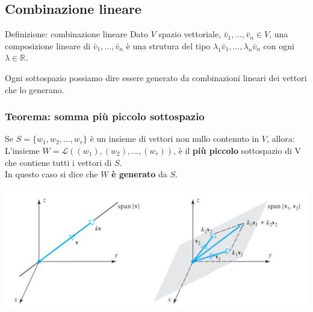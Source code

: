 \documentclass[x11names]{article}
\begin{document}
\subsection{Combinazione lineare}

\begin{center}
\colorbox{myblue}{\begin{minipage}{5.75in}
\begin{blues}{Definizione: combinazione lineare}
Dato $V$ spazio vettoriale, $\bar{v}_{1},\dots,\bar{v}_{n} \in V$, una composizione lineare di $\bar{v}_{1},\dots,\bar{v}_{n}$ è una strutura del tipo $\lambda_{1}\bar{v}_{1},\dots,\lambda_{n}\bar{v}_{n}$ con ogni $\lambda \in \mathbb{R}$.
\end{blues}
\end{minipage}}        
\end{center}
Ogni sottospazio possiamo dire essere generato da combinazioni lineari dei vettori che lo generano. 


\begin{center}
	\colorbox{myred}{\begin{minipage}{5.75in}
			\begin{redes}{}
				\subsubsection{Teorema: somma più piccolo sottospazio}
				Se $S=\{w_1,w_2,\dots,w_{r}\}$ è un insieme di vettori non nullo contenuto in $V$, allora:  \\
				L'insieme  $W = \mathscr{L}\left(\left(w_1\right),\left(w_2\right),\dots,\left(w_{r}\right)\right)$, è il \textbf{più piccolo} sottospazio di V che contiene tutti i vettori di $S$. \\
				In questo caso si dice che  $W$  \textbf{è generato} da $S$.
				
			\end{redes}
	\end{minipage}}        
\end{center}



\begin{center}
\includegraphics[scale=0.3]{figures/span.png}
\end{center}
\end{document}
